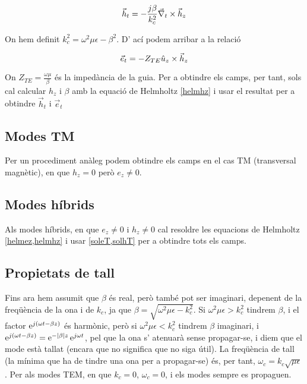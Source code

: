 \begin{equation}
  \vec h_t = - \frac{j\beta}{k_c^2} \vec \nabla_t \times \vec h_z
\end{equation}

On hem definit $k_c ^2 = \omega^2 \mu\epsilon - \beta^2$. D' ací podem arribar a la relació

\begin{equation}
  \vec e_t = -Z_{TE} \hat u_z \times \vec h_z
\end{equation}

On $Z_{TE} = \frac{\omega \mu}{\beta}$ és la impedància de la guia. Per a obtindre els camps, per tant, sols cal calcular $h_z$ i $\beta$ amb la equació de Helmholtz \cref{helmhz} i usar el resultat per a obtindre $\vec h_t$ i $\vec e_t$

\subsection{Modes TM}

Per un procediment anàleg podem obtindre els camps en el cas TM (transversal magnètic), en que $h_z = 0$ però $e_z \neq 0$.

\subsection{Modes híbrids}

Als modes híbrids, en que $e_z \neq 0$ i $h_z \neq 0$ cal resoldre les equacions de Helmholtz \cref{helmez,helmhz} i usar \cref{soleT,solhT} per a obtindre tots els camps.

\subsection{Propietats de tall}

Fins ara hem assumit que $\beta$ és real, però també pot ser imaginari, depenent de la freqüència de la ona i de $k_c$, ja que $\beta = \sqrt{\omega ^2 \mu\epsilon - k_c^2}$. Si $\omega ^2 \mu\epsilon > k_c^2$ tindrem $\beta$, i el factor $\operatorname{e}^{j(\omega t - \beta z)}$ és harmònic, però si $\omega ^2 \mu\epsilon < k_c^2$ tindrem $\beta$ imaginari, i $\operatorname{e}^{j(\omega t - \beta z)} = \operatorname{e}^{-\vert\beta\vert z} \operatorname{e}^{j\omega t}$, pel que la ona s' atenuarà sense propagar-se, i diem que el mode està tallat (encara que no significa que no siga útil). La freqüència de tall (la mínima que ha de tindre una ona per a propagar-se) és, per tant, $\omega_c = k_c \sqrt{\mu\epsilon}$. Per als modes TEM, en que $k_c = 0$, $\omega_c = 0$, i els modes sempre es propaguen.

